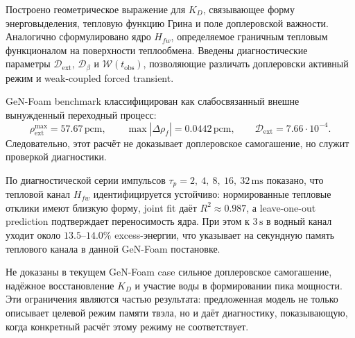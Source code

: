 \documentclass[12pt]{article}
\begin{document}
Построено геометрическое выражение для \(K_D\), связывающее форму энерговыделения, тепловую функцию Грина и поле доплеровской важности. Аналогично сформулировано ядро \(H_{fw}\), определяемое граничным тепловым функционалом на поверхности теплообмена. Введены диагностические параметры \(\mathcal D_{\mathrm{ext}}\), \(\mathcal D_\beta\) и \(\mathcal W(t_{\mathrm{obs}})\), позволяющие различать доплеровски активный режим и weak-coupled forced transient.

GeN-Foam benchmark классифицирован как слабосвязанный внешне вынужденный переходный процесс:
\[
\rho_{\mathrm{ext}}^{\max}=57.67\,\mathrm{pcm},
\qquad
\max|\Delta\rho_f|=0.0442\,\mathrm{pcm},
\qquad
\mathcal D_{\mathrm{ext}}=7.66\cdot10^{-4}.
\]
Следовательно, этот расчёт не доказывает доплеровское самогашение, но служит проверкой диагностики.

По диагностической серии импульсов \(\tau_p=2,\ 4,\ 8,\ 16,\ 32\,\mathrm{ms}\) показано, что тепловой канал \(H_{fw}\) идентифицируется устойчиво: нормированные тепловые отклики имеют близкую форму, joint fit даёт \(R^2\approx0.987\), а leave-one-out prediction подтверждает переносимость ядра. При этом к \(3\,\mathrm{s}\) в водный канал уходит около \(13.5\)--\(14.0\%\) excess-энергии, что указывает на секундную память теплового канала в данной GeN-Foam постановке.

Не доказаны в текущем GeN-Foam case сильное доплеровское самогашение, надёжное восстановление \(K_D\) и участие воды в формировании пика мощности. Эти ограничения являются частью результата: предложенная модель не только описывает целевой режим памяти твэла, но и даёт диагностику, показывающую, когда конкретный расчёт этому режиму не соответствует.

\newpage
\end{document}
